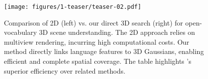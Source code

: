 \begin{figure}[t!]
    \centering
    \texttt{[image: figures/1-teaser/teaser-02.pdf]}\vspace{2mm}\\
    \vspace{-2mm}
    \caption{
        Comparison of 2D (left) vs. our direct 3D search (right) for open-vocabulary 3D scene understanding. The 2D approach relies on multiview rendering, incurring high computational costs. Our method directly links language features to 3D Gaussians, enabling efficient and complete spatial coverage. The table highlights \nickname’s superior efficiency over related methods.
    }
    \label{fig:teaser}
    \vspace{-4mm}
\end{figure}